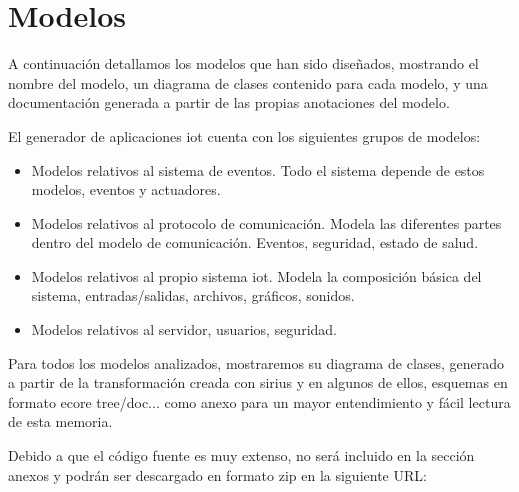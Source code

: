 \section{Modelos}

A continuación detallamos los modelos que han sido diseñados, mostrando el nombre del modelo, un diagrama de clases contenido para cada modelo, y una documentación generada a partir de las propias anotaciones del modelo.

El generador de aplicaciones \gls{iot} cuenta con los siguientes grupos de modelos:

\begin{itemize}
\item Modelos relativos al sistema de eventos.
Todo el sistema depende de estos modelos, eventos y actuadores.

\item Modelos relativos al protocolo de comunicación. Modela las diferentes partes dentro del modelo de comunicación. Eventos, seguridad, estado de salud.

\item Modelos relativos al propio sistema \gls{iot}. Modela la composición básica del sistema, entradas/salidas, archivos, gráficos, sonidos.

\item Modelos relativos al servidor, usuarios, seguridad.
\end{itemize}

Para todos los modelos analizados, mostraremos su diagrama de clases, generado a partir de la transformación creada con \gls{sirius} \cite{sirius} y en algunos de ellos, esquemas en formato \gls{ecore} tree/doc... como anexo para un mayor entendimiento y fácil lectura de esta memoria.

Debido a que el código fuente es muy extenso, no será incluido en la sección anexos y  podrán ser descargado en formato \gls{zip} en la siguiente URL: \textcite{tfm_cesarlaso_codigo}











